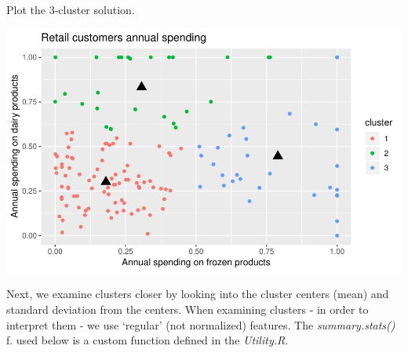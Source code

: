 \documentclass[]{article}
\newenvironment{Shaded}{\begin{snugshade}}{\end{snugshade}}
\newcommand{\KeywordTok}[1]{\textcolor[rgb]{0.13,0.29,0.53}{\textbf{#1}}}
\newcommand{\DataTypeTok}[1]{\textcolor[rgb]{0.13,0.29,0.53}{#1}}
\newcommand{\DecValTok}[1]{\textcolor[rgb]{0.00,0.00,0.81}{#1}}
\newcommand{\StringTok}[1]{\textcolor[rgb]{0.31,0.60,0.02}{#1}}
\newcommand{\CommentTok}[1]{\textcolor[rgb]{0.56,0.35,0.01}{\textit{#1}}}
\newcommand{\OperatorTok}[1]{\textcolor[rgb]{0.81,0.36,0.00}{\textbf{#1}}}
\newcommand{\NormalTok}[1]{#1}
\begin{document}
Plot the 3-cluster solution.

\begin{Shaded}
\end{Shaded}

\begin{center}\includegraphics{7._K-means_Clustering_files/figure-latex/unnamed-chunk-32-1} \end{center}

Next, we examine clusters closer by looking into the cluster centers
(mean) and standard deviation from the centers. When examining clusters
- in order to interpret them - we use `regular' (not normalized)
features. The \emph{summary.stats()} f. used below is a custom function
defined in the \emph{Utility.R}.
\end{document}
